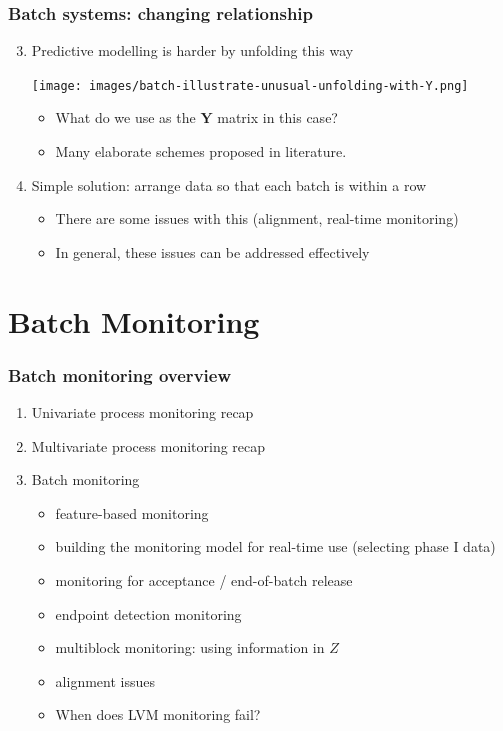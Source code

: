 \documentclass[handout, 12pt]{beamer}
\begin{document}
\begin{frame}\frametitle{Batch systems: changing relationship}
\begin{enumerate}
	\setcounter{enumi}{2}
	\item 	Predictive modelling is harder by unfolding this way

			\begin{center}
				\texttt{[image: images/batch-illustrate-unusual-unfolding-with-Y.png]}
			\end{center}
			
		
			\begin{itemize}
				\item 	What do we use as the \( \mathbf{Y} \) matrix in this case?
				\item 	Many elaborate schemes proposed in literature.			
			\end{itemize}
		
	\item 	Simple solution: arrange data so that each batch is within a row
	
			\begin{itemize}
				\item 	There are some issues with this  (alignment, real-time monitoring)
				\item 	In general, these issues can be addressed effectively
			\end{itemize}
\end{enumerate}
\end{frame}


\section{Batch Monitoring}

\begin{frame}\frametitle{Batch monitoring overview}

\begin{enumerate}
	\item 	Univariate process monitoring recap
	
	\item	Multivariate process monitoring recap
	
	\item	Batch monitoring
	
		\begin{itemize}
			\item	feature-based monitoring			
			\item	building the monitoring model for real-time use (selecting phase I data)
			\item	monitoring for acceptance / end-of-batch release
			\item	endpoint detection monitoring
			\item	multiblock monitoring: using information in \( Z \)			
			\item	alignment issues
			\item 	When does LVM monitoring fail?
		\end{itemize}
\end{enumerate}
\end{frame}
\end{document}
